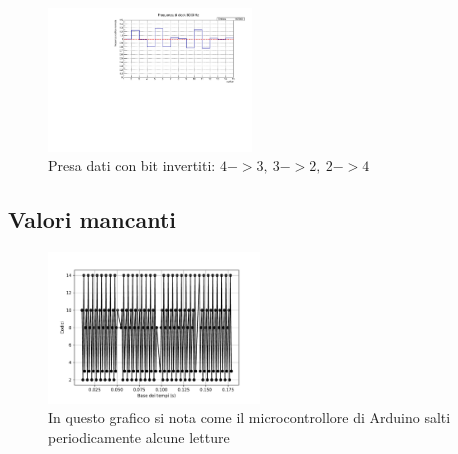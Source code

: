 \documentclass[journal]{IEEEtran}
\begin{document}
\begin{figure}[H]%
\begin{center}
\includegraphics[width=0.48\textwidth]{analysis/output/dnl_non_lin_8000hz_bars.pdf}
\caption{Presa dati con bit invertiti: $ 4->3, \ 3->2, \ 2->4 $}
\label{fig:graph_dnl_non_lin}
\end{center}
\end{figure}




\subsection{Valori mancanti}

\begin{figure}[H]%
\begin{center}
\includegraphics[width=0.50\textwidth]{analysis/output/letture_mancanti.pdf}
\caption{In questo grafico si nota come il microcontrollore di Arduino salti periodicamente alcune letture}
\label{fig:missing}
\end{center}
\end{figure}
\end{document}
